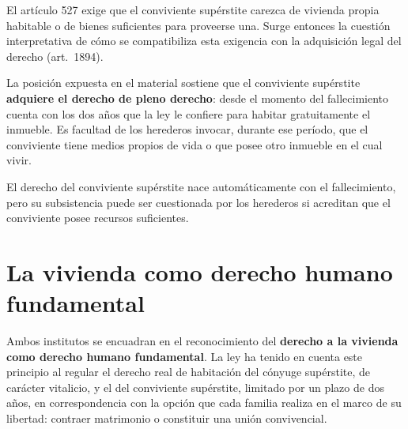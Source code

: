 \documentclass[12pt,oneside]{book}
\begin{document}
El artículo 527 exige que el conviviente supérstite carezca de vivienda propia habitable o de bienes suficientes para proveerse una. Surge entonces la cuestión interpretativa de cómo se compatibiliza esta exigencia con la adquisición legal del derecho (art.~1894).

La posición expuesta en el material sostiene que el conviviente supérstite \textbf{adquiere el derecho de pleno derecho}: desde el momento del fallecimiento cuenta con los dos años que la ley le confiere para habitar gratuitamente el inmueble. Es facultad de los herederos invocar, durante ese período, que el conviviente tiene medios propios de vida o que posee otro inmueble en el cual vivir.

\begin{importante}
El derecho del conviviente supérstite nace automáticamente con el fallecimiento, pero su subsistencia puede ser cuestionada por los herederos si acreditan que el conviviente posee recursos suficientes.
\end{importante}

\section{La vivienda como derecho humano fundamental}

Ambos institutos se encuadran en el reconocimiento del \textbf{derecho a la vivienda como derecho humano fundamental}. La ley ha tenido en cuenta este principio al regular el derecho real de habitación del cónyuge supérstite, de carácter vitalicio, y el del conviviente supérstite, limitado por un plazo de dos años, en correspondencia con la opción que cada familia realiza en el marco de su libertad: contraer matrimonio o constituir una unión convivencial.
\end{document}
